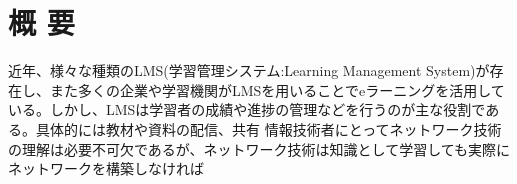 \section*{\center 概 要}

近年、様々な種類のLMS(学習管理システム:Learning Management System)が存在し、また多くの企業や学習機関がLMSを用いることでeラーニングを活用している。しかし、LMSは学習者の成績や進捗の管理などを行うのが主な役割である。具体的には教材や資料の配信、共有
情報技術者にとってネットワーク技術の理解は必要不可欠であるが、ネットワーク技術は知識として学習しても実際にネットワークを構築しなければ
